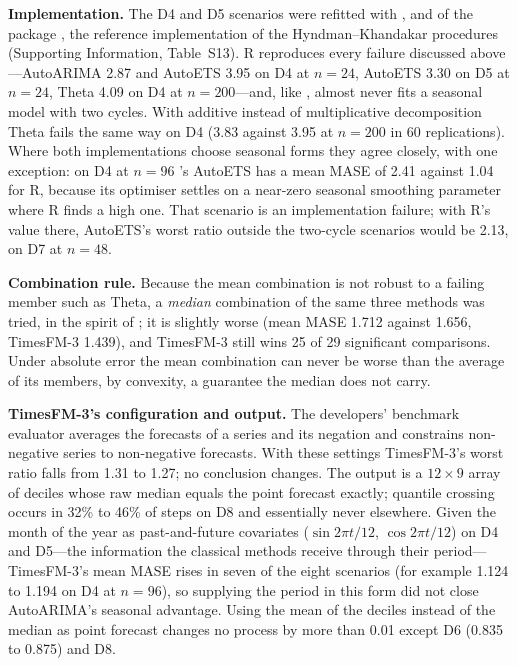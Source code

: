 \textbf{Implementation.} The D4 and D5 scenarios were refitted with ,  and
 of the  package  \citep{hyndman2008forecast}, the reference
implementation of the Hyndman--Khandakar procedures (Supporting Information, Table~S13). R reproduces every
failure discussed above---AutoARIMA 2.87 and AutoETS 3.95 on D4 at $n = 24$, AutoETS 3.30 on D5 at $n = 24$,
Theta 4.09 on D4 at $n = 200$---and, like , almost never fits a seasonal model with two
cycles. With additive instead of multiplicative decomposition Theta fails the same way on D4 (3.83 against
3.95 at $n = 200$ in 60 replications). Where both implementations choose seasonal forms they agree closely,
with one exception: on D4 at $n = 96$ 's AutoETS has a mean MASE of 2.41 against 1.04 for R,
because its optimiser settles on a near-zero seasonal smoothing parameter where R finds a high one. That scenario
is an implementation failure; with R's value there, AutoETS's worst ratio outside the two-cycle scenarios would
be 2.13, on D7 at $n = 48$.

\textbf{Combination rule.} Because the mean combination is not robust to a failing member such as Theta, a
\emph{median} combination of the same three methods was tried, in the spirit of \citet{petropoulos2020scum};
it is slightly worse (mean MASE 1.712 against 1.656, TimesFM-3 1.439), and TimesFM-3 still wins 25 of 29
significant comparisons. Under absolute error the mean combination can never be worse than the average of its
members, by convexity, a guarantee the median does not carry.

\textbf{TimesFM-3's configuration and output.} The developers' benchmark evaluator averages the forecasts of
a series and its negation and constrains non-negative series to non-negative forecasts. With these settings
TimesFM-3's worst ratio falls from 1.31 to 1.27; no conclusion changes. The output is a $12 \times 9$ array of
deciles whose raw median equals the point forecast exactly; quantile crossing occurs in 32\% to 46\% of steps
on D8 and essentially never elsewhere. Given the month of the year as past-and-future covariates
($\sin 2\pi t/12$, $\cos 2\pi t/12$) on D4 and D5---the information the classical methods receive through
their period---TimesFM-3's mean MASE rises in seven of the eight scenarios (for example 1.124 to 1.194 on D4 at
$n = 96$), so supplying the period in this form did not close AutoARIMA's seasonal advantage. Using the mean
of the deciles instead of the median as point forecast changes no process by more than 0.01 except D6 (0.835
to 0.875) and D8.

